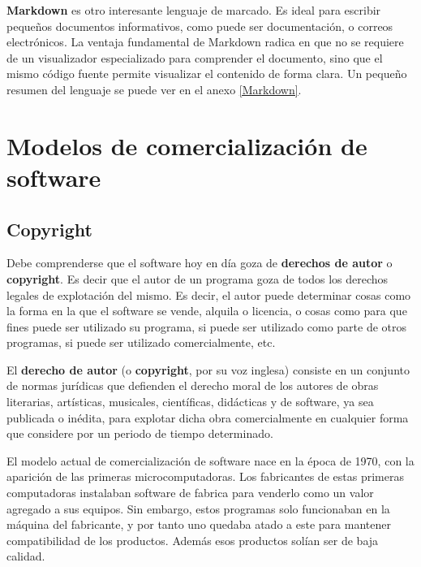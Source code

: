 \textbf{Markdown} es otro interesante lenguaje de marcado. Es ideal para escribir
pequeños documentos informativos, como puede ser documentación, o correos
electrónicos. La ventaja fundamental de Markdown radica en que no se requiere de
un visualizador especializado para comprender el documento, sino que el mismo
código fuente permite visualizar el contenido de forma clara. Un pequeño resumen
del lenguaje se puede ver en el anexo \ref{Markdown}.

\section{Modelos de comercialización de software}

\subsection{Copyright}

Debe comprenderse que el software hoy en día goza de \textbf{derechos
de autor} o \textbf{copyright}. Es decir que el autor de un programa goza de todos
los derechos legales de explotación del mismo. Es decir, el autor puede determinar
cosas como la forma en la que el software se vende, alquila o licencia, o cosas
como para que fines puede ser utilizado su programa, si puede ser utilizado como
parte de otros programas, si puede ser utilizado comercialmente, etc.

\begin{definition}
    El \textbf{derecho de autor} (o \textbf{copyright}, por su voz inglesa) consiste
    en un conjunto de normas jurídicas que defienden el derecho moral de los autores
    de obras literarias, artísticas, musicales, científicas, didácticas y de software,
    ya sea publicada o inédita, para explotar dicha obra comercialmente en cualquier
    forma que considere por un periodo de tiempo determinado.\autocite{oxford_copyright_2018}
\end{definition}

El modelo actual de comercialización de software nace en la época de 1970, con la
aparición de las primeras microcomputadoras. Los fabricantes de estas primeras
computadoras instalaban  software de fabrica para venderlo como un valor
agregado a sus equipos. Sin embargo, estos programas solo funcionaban en la
máquina del fabricante, y por tanto uno quedaba atado a este para mantener
compatibilidad de los productos. Además esos productos solían ser de baja calidad.

